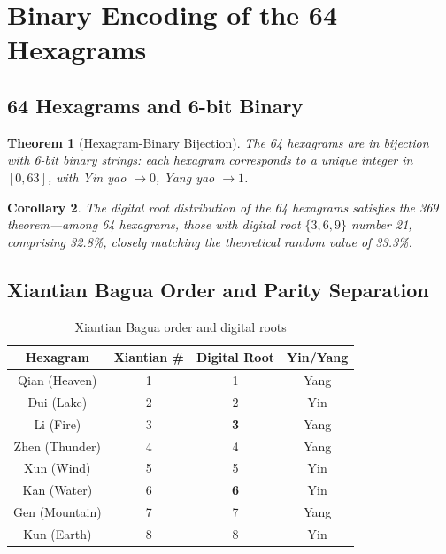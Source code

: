 \documentclass[conference]{IEEEtran}
\newtheorem{theorem}{Theorem}[section]
\newtheorem{corollary}[theorem]{Corollary}
\theoremstyle{remark}
\begin{document}
\section{Binary Encoding of the 64 Hexagrams}

\subsection{64 Hexagrams and 6-bit Binary}

\begin{theorem}[Hexagram-Binary Bijection]
The 64 hexagrams are in bijection with 6-bit binary strings: each hexagram corresponds to a unique integer in $[0,63]$, with Yin yao $\to 0$, Yang yao $\to 1$.
\end{theorem}

\begin{corollary}
The digital root distribution of the 64 hexagrams satisfies the 369 theorem---among 64 hexagrams, those with digital root $\{3,6,9\}$ number 21, comprising 32.8\%, closely matching the theoretical random value of 33.3\%.
\end{corollary}

\subsection{Xiantian Bagua Order and Parity Separation}

\begin{table}[h]
\centering
\caption{Xiantian Bagua order and digital roots}
\label{tab:bagua}
\begin{tabular}{cccc}
\toprule
Hexagram & Xiantian \# & Digital Root & Yin/Yang \\
\midrule
Qian (Heaven) & 1 & 1 & Yang \\
Dui (Lake) & 2 & 2 & Yin \\
Li (Fire) & 3 & \textbf{3} & Yang \\
Zhen (Thunder) & 4 & 4 & Yang \\
Xun (Wind) & 5 & 5 & Yin \\
Kan (Water) & 6 & \textbf{6} & Yin \\
Gen (Mountain) & 7 & 7 & Yang \\
Kun (Earth) & 8 & 8 & Yin \\
\bottomrule
\end{tabular}
\end{table}
\end{document}
